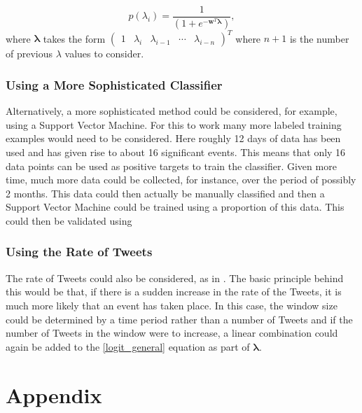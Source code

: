 \documentclass[11pt,a4paper]{article}
\begin{document}
\begin{equation}
p(\lambda_i)= \frac{1}{\left( 1 + e^{-\mathbf{w}^T\bm{\lambda}}\right)},
\label{logit_general}
\end{equation}
where $\bm{\lambda}$ takes the form $\left(\begin{matrix}
1 & \lambda_i & \lambda_{i-1} & \cdots & \lambda_{i-n}
\end{matrix}\right)^T$ where $n+1$ is the number of previous $\lambda$ values to consider. 

\subsubsection{Using a More Sophisticated Classifier}
Alternatively, a more sophisticated method could be considered, for example, using a Support Vector Machine. For this to work many more labeled training examples would need to be considered. Here roughly 12 days of data has been used and has given rise to about 16 significant events. This means that only 16 data points can be used as positive targets to train the classifier. Given more time, much more data could be collected, for instance, over the period of possibly 2 months. This data could then actually be manually classified and then a Support Vector Machine could be trained using a proportion of this data. This could then be validated using 

\subsubsection{Using the Rate of Tweets}
The rate of Tweets could also be considered, as in \cite{microblogs}. The basic principle behind this would be that, if there is a sudden increase in the rate of the Tweets, it is much more likely that an event has taken place. In this case, the window size could be determined by a time period rather than a number of Tweets and if the number of Tweets in the window were to increase, a linear combination could again be added to the \eqref{logit_general} equation as part of $\bm{\lambda}$.


\clearpage



\clearpage

\section*{Appendix}\label{appendixa}

\appendix
{}
\end{document}
